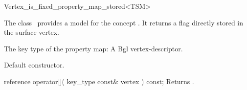 

\begin{ccRefClass}{Vertex_is_fixed_property_map_stored<TSM>}


\ccDefinition

The class \ccRefName\ provides a model for the concept .
It returns a flag directly stored in the surface vertex.


\ccTypes
  {The key type of the property map: A {\sc Bgl vertex-descriptor}. }

\ccCreation
{}  %

{Default constructor.}

\ccOperations

\ccMethod
  {reference operator[]( key_type const& vertex ) const;}
  {Returns .}  
    
\ccIsModel
{}

\ccSeeAlso
{}\\

\end{ccRefClass}


